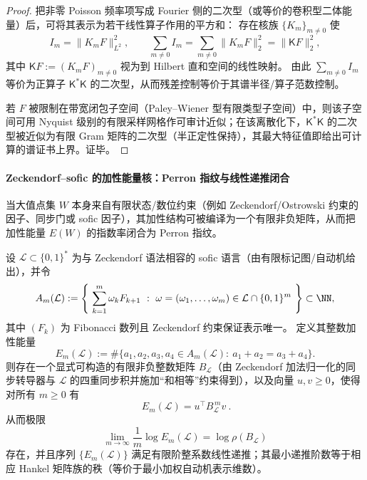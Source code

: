 \begin{proof}
把非零 Poisson 频率项写成 Fourier 侧的二次型（或等价的卷积型二体能量）后，可将其表示为若干线性算子作用的平方和：
存在核族 \(\{K_m\}_{m\ne 0}\) 使
\[
I_m=\|K_m F\|_{L^2}^2,\qquad \sum_{m\ne 0}I_m=\sum_{m\ne 0}\|K_mF\|_2^2=\|\mathsf{K}F\|_2^2,
\]
其中 \(\mathsf{K}F:=(K_mF)_{m\ne 0}\) 视为到 Hilbert 直和空间的线性映射。
由此 \(\sum_{m\ne 0} I_m\) 等价为正算子 \(\mathsf{K}^\ast\mathsf{K}\) 的二次型，从而残差控制等价于其谱半径/算子范数控制。

若 \(F\) 被限制在带宽闭包子空间（Paley--Wiener 型有限类型子空间）中，则该子空间可用 Nyquist 级别的有限采样网格作可审计近似；在该离散化下，\(\mathsf{K}^\ast\mathsf{K}\) 的二次型被近似为有限 Gram 矩阵的二次型（半正定性保持），其最大特征值即给出可计算的谱证书上界。证毕。
\end{proof}

\paragraph{Zeckendorf--sofic 的加性能量核：Perron 指纹与线性递推闭合}
当大值点集 \(W\) 本身来自有限状态/数位约束（例如 Zeckendorf/Ostrowski 约束的因子、同步门或 sofic 因子），其加性结构可被编译为一个有限非负矩阵，从而把加性能量 \(E(W)\) 的指数率闭合为 Perron 指纹。

\begin{theorem}\label{thm:gm-zeck-sofic-additive-energy}
设 \(\mathcal{L}\subset\{0,1\}^\ast\) 为与 Zeckendorf 语法相容的 sofic 语言（由有限标记图/自动机给出），并令
\[
A_m(\mathcal{L})
:=\left\{\ \sum_{k=1}^{m}\omega_kF_{k+1}\ :\ \omega=(\omega_1,\dots,\omega_m)\in \mathcal{L}\cap\{0,1\}^m\ \right\}\subset\NN,
\]
其中 \((F_k)\) 为 Fibonacci 数列且 Zeckendorf 约束保证表示唯一。
定义其整数加性能量
\[
E_m(\mathcal{L})
:=\#\{a_1,a_2,a_3,a_4\in A_m(\mathcal{L}):\ a_1+a_2=a_3+a_4\}.
\]
则存在一个显式可构造的有限非负整数矩阵 \(B_{\mathcal{L}}\)（由 Zeckendorf 加法归一化的同步转导器与 \(\mathcal{L}\) 的四重同步积并施加“和相等”约束得到），以及向量 \(u,v\ge 0\)，使得对所有 \(m\ge 0\) 有
\[
\boxed{\ E_m(\mathcal{L})=u^\top B_{\mathcal{L}}^{\,m}v\ }.
\]
从而极限
\[
\lim_{m\to\infty}\frac1m\log E_m(\mathcal{L})=\log\rho(B_{\mathcal{L}})
\]
存在，并且序列 \(\{E_m(\mathcal{L})\}\) 满足有限阶整系数线性递推；其最小递推阶数等于相应 Hankel 矩阵族的秩（等价于最小加权自动机表示维数）。
\end{theorem}

